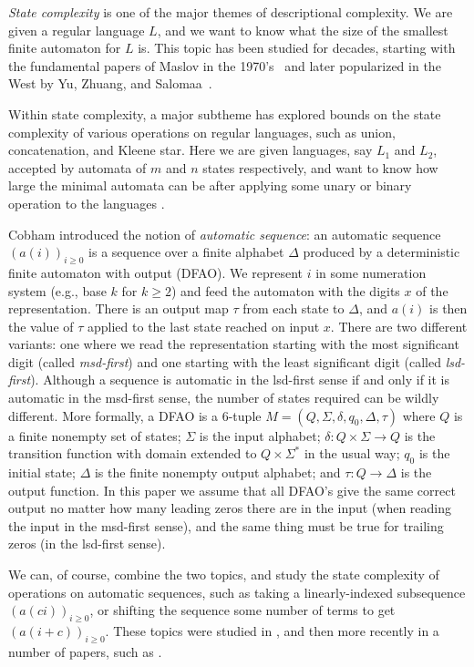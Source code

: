 \documentclass[12pt,runningheads]{llncs}
\begin{document}
{\it State complexity} is one of the major themes of descriptional complexity.  We are given a regular language $L$, and we want to know what the size of the smallest finite automaton for $L$ is.  This topic has been studied for decades, starting with the fundamental papers of Maslov in the 1970's~\cite{Maslov:1970,Maslov:1973} and later popularized in the West by Yu, Zhuang, and Salomaa~\cite{Yu&Zhuang&Salomaa:1994}. 

Within state complexity, a major subtheme has explored bounds on the state complexity of various operations on regular languages, such as union, concatenation, and Kleene star.   Here we are given languages, say $L_1$ and $L_2$, accepted by automata of $m$ and $n$ states respectively, and want to know how large the minimal automata can be after applying some unary or binary operation to the languages \cite{Yu&Zhuang&Salomaa:1994}.

Cobham \cite{Cobham:1969,Cobham:1972} introduced the notion of {\it automatic sequence}: an automatic sequence $(a(i))_{i \geq 0}$ is a sequence over a finite alphabet $\Delta$ produced by a deterministic finite automaton with output (DFAO). We represent $i$ in some numeration system (e.g., base $k$ for $k \geq 2$) and feed the automaton with the digits $x$ of the representation. There is an output map $\tau$ from each state to $\Delta$, and $a(i)$ is then the value of $\tau$ applied to the last state reached on input $x$. There are two different variants: one where we read the representation starting with the most significant digit (called {\it msd-first}) and one starting with the least significant digit (called {\it lsd-first}). Although a sequence is automatic in the lsd-first sense if and only if it is automatic in the msd-first sense, the number of states required can be wildly different. More formally, a DFAO is a $6$-tuple $M=(Q,\Sigma,\delta,q_0,\Delta,\tau)$ where 
 $Q$ is a finite nonempty set of states;
$\Sigma$ is the input alphabet; 
$\delta:Q\times \Sigma \to Q$ is the transition function with domain extended to $Q\times \Sigma^*$ in the usual way;
$q_0$ is the initial state; 
$\Delta$ is the finite nonempty output alphabet; and
$\tau:Q\to \Delta$ is the output function. 
In this paper we assume that all DFAO's give the same correct output no matter how many leading zeros there are in the input (when reading the input in the msd-first sense), and the same thing must be true for
trailing zeros (in the lsd-first sense). 

We can, of course, combine the two topics, and study the state complexity of operations on automatic sequences, such as taking a linearly-indexed subsequence $(a(ci))_{i \geq 0}$, or shifting 
the sequence some number of terms
to get $(a(i+c))_{i \geq 0}$.  These topics were studied in \cite{Allouche&Shallit:2003}, and then more recently in a number of papers, such as
\cite{Zantema:2020,Charlier&Rampersad&Rigo&Waxweiler:2011,Zantema&Bosma:2022,Moradi&Rampersad&Shallit:2025}.
\end{document}
